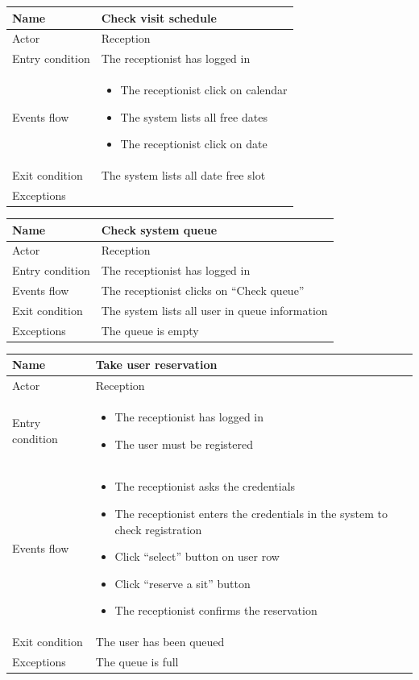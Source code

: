 \begin{tabular}{|p{5cm} | p{7cm} | }
	\hline
	Name & Check visit schedule \\
	\hline
	Actor & Reception \\
	\hline
	Entry condition & 
	The receptionist has logged in \\
	\hline
	Events flow & 
	\begin{itemize}
		\item The receptionist click on calendar
		\item The system lists all free dates
		\item The receptionist click on date
	\end{itemize} \\
	\hline
	Exit condition &
	The system lists all date free slot \\
	\hline 
	Exceptions & \\
	\hline
\end{tabular}

\begin{tabular}{|p{5cm} | p{7cm} | }
	\hline
	Name & Check system queue \\
	\hline
	Actor & Reception \\
	\hline
	Entry condition & 
	The receptionist has logged in  \\
	\hline
	Events flow & 
	The receptionist clicks on “Check queue”  \\
	\hline
	Exit condition &
	The system lists all user in queue information \\
	\hline 
	Exceptions & The queue is empty \\
	\hline
\end{tabular}

\begin{tabular}{|p{5cm} | p{7cm} | }
	\hline
	Name & Take user reservation \\
	\hline
	Actor & Reception \\
	\hline
	Entry condition &
	\begin{itemize}
		\item The receptionist has logged in 
		\item The user must be registered
	\end{itemize} \\
	\hline
	Events flow & 
	\begin{itemize}
		\item The receptionist asks the credentials
		\item The receptionist enters the credentials in the system to check registration
		\item Click “select” button on user row
		\item Click “reserve a sit” button 
		\item The receptionist confirms the reservation
	\end{itemize} \\
	\hline
	Exit condition &
	The user has been queued \\
	\hline 
	Exceptions & 
	The queue is full \\
	\hline
\end{tabular}

